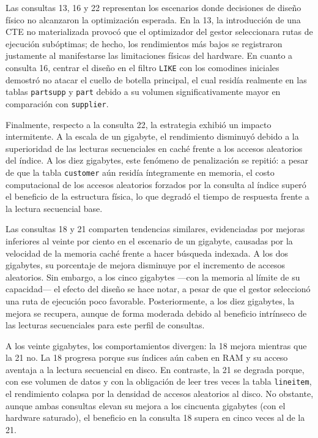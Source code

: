 \documentclass[12pt, letter paper]{report}
\begin{document}
        Las consultas 13, 16 y 22 representan los escenarios donde decisiones de
        diseño físico no alcanzaron la optimización esperada. En la 13, la
        introducción de una CTE no materializada provocó que el optimizador del
        gestor seleccionara rutas de ejecución subóptimas; de hecho, los
        rendimientos más bajos se registraron justamente al manifestarse las
        limitaciones físicas del hardware. En cuanto a consulta 16, centrar el
        diseño en el filtro \texttt{LIKE} con los comodines iniciales demostró
        no atacar el cuello de botella principal, el cual residía realmente en
        las tablas \texttt{partsupp} y \texttt{part} debido a su volumen
        significativamente mayor en comparación con \texttt{supplier}.

        Finalmente, respecto a la consulta 22, la estrategia exhibió un impacto
        intermitente. A la escala de un gigabyte, el rendimiento disminuyó
        debido a la superioridad de las lecturas secuenciales en caché frente a
        los accesos aleatorios del índice. A los diez gigabytes, este fenómeno
        de penalización se repitió: a pesar de que la tabla \texttt{customer}
        aún residía íntegramente en memoria, el costo computacional de los
        accesos aleatorios forzados por la consulta al índice superó el
        beneficio de la estructura física, lo que degradó el tiempo de respuesta
        frente a la lectura secuencial base.

        Las consultas 18 y 21 comparten tendencias similares, evidenciadas por
        mejoras inferiores al veinte por ciento en el escenario de un gigabyte,
        causadas por la velocidad de la memoria caché frente a hacer búsqueda
        indexada. A los dos gigabytes, su porcentaje de mejora disminuye por el
        incremento de accesos aleatorios. Sin embargo, a los cinco gigabytes
        ---con la memoria al límite de su capacidad--- el efecto del diseño se
        hace notar, a pesar de que el gestor seleccionó una ruta de ejecución
        poco favorable. Posteriormente, a los diez gigabytes, la mejora se
        recupera, aunque de forma moderada debido al beneficio intrínseco de las
        lecturas secuenciales para este perfil de consultas.

        A los veinte gigabytes, los comportamientos divergen: la 18 mejora
        mientras que la 21 no. La 18 progresa porque sus índices aún caben en
        RAM y su acceso aventaja a la lectura secuencial en disco. En contraste,
        la 21 se degrada porque, con ese volumen de datos y con la obligación de
        leer tres veces la tabla \texttt{lineitem}, el rendimiento colapsa por
        la densidad de accesos aleatorios al disco. No obstante, aunque ambas
        consultas elevan su mejora a los cincuenta gigabytes (con el hardware
        saturado), el beneficio en la consulta 18 supera en cinco veces al de la
        21.
\end{document}
